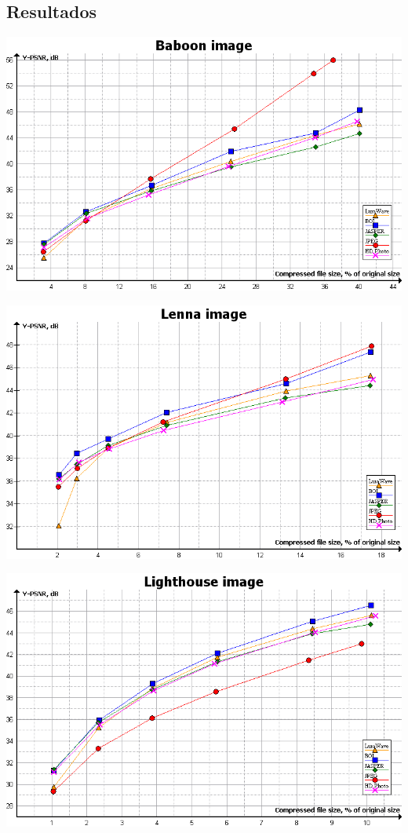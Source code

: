 \documentclass{beamer}
\begin{document}
\subsection{Resultados}
\begin{frame}
   \includegraphics[width=\textwidth]{figure/baboon_psnr.png}
\end{frame}
\begin{frame}
   \includegraphics[width=\textwidth]{figure/lenna_psnr.png}
\end{frame}
\begin{frame}
   \includegraphics[width=\textwidth]{figure/lighthouse_psnr.png}
\end{frame}
\end{document}
